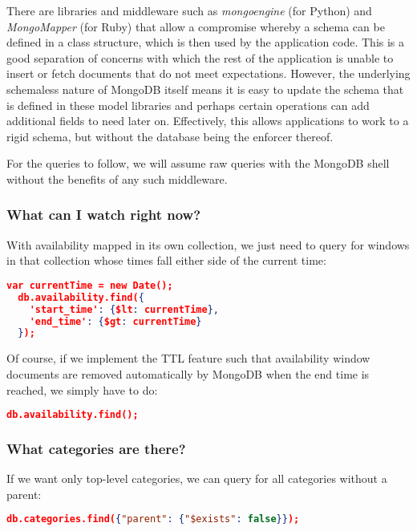 \documentclass[11pt,a4paper]{article}
\begin{document}
There are libraries and middleware such as \emph{mongoengine} (for
Python) and \emph{MongoMapper} (for Ruby) that allow a compromise
whereby a schema can be defined in a class structure, which is
then used by the application code. This is a good separation of concerns
with which the rest of the application is unable to insert or fetch
documents that do not meet expectations. However, the underlying
schemaless nature of MongoDB itself means it is easy to update
the schema that is defined in these model libraries and perhaps
certain operations can add additional fields to need later on. Effectively,
this allows applications to work to a rigid schema, but without the
database being the enforcer thereof.

For the queries to follow, we will assume raw queries with the MongoDB
shell without the benefits of any such middleware.

\subsubsection{What can I watch right now?}

With availability mapped in its own collection, we just need to query
for windows in that collection whose times fall either side of the
current time:

\begin{lstlisting}[language=json]
  var currentTime = new Date();
  db.availability.find({
    'start_time': {$lt: currentTime},
    'end_time': {$gt: currentTime}
  });
\end{lstlisting}

Of course, if we implement the TTL feature such that availability
window documents are removed automatically by MongoDB when the end time
is reached, we simply have to do:

\begin{lstlisting}[language=json]
  db.availability.find();
\end{lstlisting}

\subsubsection{What categories are there?}

If we want only top-level categories, we can query for all categories
without a parent:

\begin{lstlisting}[language=json]
  db.categories.find({"parent": {"$exists": false}});
\end{lstlisting}
\end{document}
